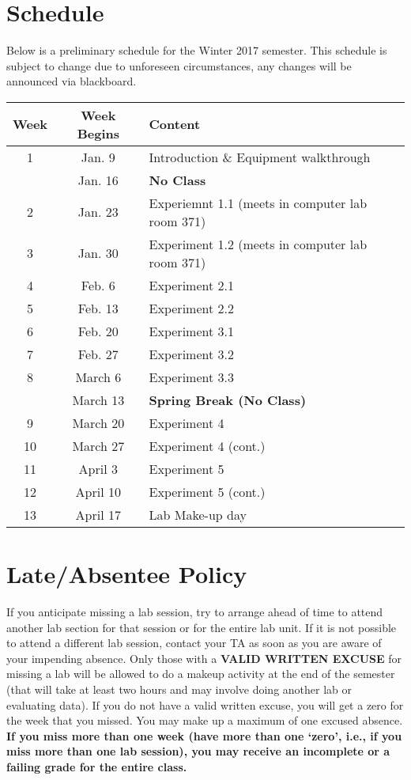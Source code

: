 \newpage

\section*{Schedule}
Below is a preliminary schedule for the Winter 2017 semester.
This schedule is subject to change due to unforeseen circumstances, any changes will be announced via blackboard. \\

\begin{tabular}{ |c|c|l| } 
 \hline
 \textbf{Week} & \textbf{Week Begins} & \textbf{Content} \\ 
 \hline
 1 & Jan. 9 & Introduction \& Equipment walkthrough \\ 
 \hline 
    & Jan. 16 & \textbf{No Class} \\ 
 \hline
 2 & Jan. 23 & Experiemnt 1.1 (meets in computer lab room 371) \\ 
 \hline
 3 & Jan. 30 & Experiment 1.2 (meets in computer lab room 371)\\ 
 \hline
 4 & Feb. 6 & Experiment 2.1 \\ 
 \hline
 5 & Feb. 13 & Experiment 2.2 \\ 
 \hline
 6 & Feb. 20 & Experiment 3.1 \\ 
 \hline
 7 & Feb. 27 & Experiment 3.2 \\ 
 \hline
 8 & March 6 & Experiment 3.3 \\ 
 \hline
   & March 13 & \textbf{Spring Break (No Class)} \\ 
 \hline
 9 & March 20 & Experiment 4 \\ 
 \hline
 10 & March 27 & Experiment 4 (cont.) \\ 
 \hline
 11 & April 3 & Experiment 5 \\ 
 \hline
 12 & April 10 & Experiment 5 (cont.) \\ 
 \hline
 13 & April 17 & Lab Make-up day \\ 
 \hline
\end{tabular}

\section*{Late/Absentee Policy}
If you anticipate missing a lab session, try to arrange ahead of time to attend another lab section for that session or for the entire lab unit.
If it is not possible to attend a different lab session, contact your TA as soon as you are aware of your impending absence.
Only those with a \textbf{VALID WRITTEN EXCUSE} for missing a lab will be allowed to do a makeup activity at the end of the semester (that will take at least two hours and may involve doing another lab or evaluating data).
If you do not have a valid written excuse, you will get a zero for the week that you missed.
You may make up a maximum of one excused absence.
\textbf{If you miss more than one week (have more than one `zero', i.e., if you miss more than one lab session), you may receive an incomplete or a failing grade for the entire class.}

